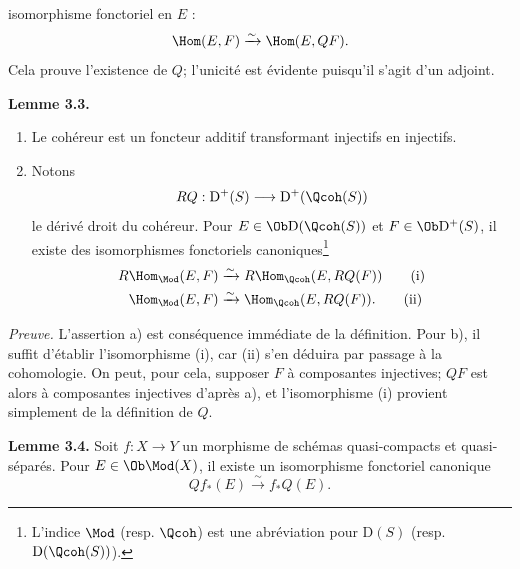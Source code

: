 isomorphisme fonctoriel en $E$ :
\[
 \Hom(E,F)\xrightarrow{\sim}\Hom(E,QF).
\]
Cela prouve l'existence de $Q$; l'unicité est évidente puisqu'il s'agit d'un adjoint.

\textbf{Lemme 3.3.} \begin{enumerate}[label=\alph*)]
\item Le cohéreur est un foncteur additif transformant injectifs en injectifs.
\item Notons
\[
 RQ:\mathrm D^+(S)\longrightarrow \mathrm D^+(\Qcoh(S))
\]
le dérivé droit du cohéreur. Pour $E\in\Ob\mathrm D(\Qcoh(S))$ et $F\in\Ob\mathrm D^+(S)$, il existe des isomorphismes fonctoriels canoniques\footnote{L'indice $\Mod$ (resp. $\Qcoh$) est une abréviation pour $\mathrm D(S)$ (resp. $\mathrm D(\Qcoh(S))$).}
\begin{align}
 R\Hom_{\Mod}(E,F)&\xrightarrow{\sim} R\Hom_{\Qcoh}(E,RQ(F)) \tag{i}\\
 \Hom_{\Mod}(E,F)&\xrightarrow{\sim} \Hom_{\Qcoh}(E,RQ(F)). \tag{ii}
\end{align}
\end{enumerate}

\emph{Preuve.} L'assertion a) est conséquence immédiate de la définition. Pour b), il suffit d'établir l'isomorphisme (i), car (ii) s'en déduira par passage à la cohomologie. On peut, pour cela, supposer $F$ à composantes injectives; $QF$ est alors à composantes injectives d'après a), et l'isomorphisme (i) provient simplement de la définition de $Q$.

\textbf{Lemme 3.4.} Soit $f:X\longrightarrow Y$ un morphisme de schémas quasi-compacts et quasi-séparés. Pour $E\in\Ob\Mod(X)$, il existe un isomorphisme fonctoriel canonique
\[
 Qf_*(E)\xrightarrow{\sim} f_*Q(E).
\]

